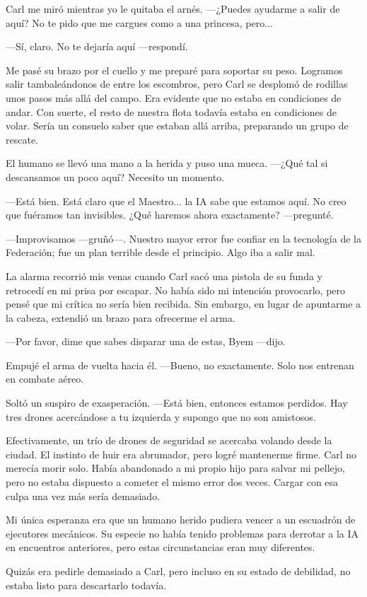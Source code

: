Carl me miró mientras yo le quitaba el arnés. —¿Puedes ayudarme a salir de aquí? No te pido que me cargues como a una princesa, pero...

—Sí, claro. No te dejaría aquí —respondí.

Me pasé su brazo por el cuello y me preparé para soportar su peso. Logramos salir tambaleándonos de entre los escombros, pero Carl se desplomó de rodillas unos pasos más allá del campo. Era evidente que no estaba en condiciones de andar. Con suerte, el resto de nuestra flota todavía estaba en condiciones de volar. Sería un consuelo saber que estaban allá arriba, preparando un grupo de rescate.

El humano se llevó una mano a la herida y puso una mueca. —¿Qué tal si descansamos un poco aquí? Necesito un momento.

—Está bien. Está claro que el Maestro... la IA sabe que estamos aquí. No creo que fuéramos tan invisibles. ¿Qué haremos ahora exactamente? —pregunté.

—Improvisamos —gruñó—. Nuestro mayor error fue confiar en la tecnología de la Federación; fue un plan terrible desde el principio. Algo iba a salir mal.

La alarma recorrió mis venas cuando Carl sacó una pistola de su funda y retrocedí en mi prisa por escapar. No había sido mi intención provocarlo, pero pensé que mi crítica no sería bien recibida. Sin embargo, en lugar de apuntarme a la cabeza, extendió un brazo para ofrecerme el arma.

—Por favor, dime que sabes disparar una de estas, Byem —dijo.

Empujé el arma de vuelta hacia él. —Bueno, no exactamente. Solo nos entrenan en combate aéreo.

Soltó un suspiro de exasperación. —Está bien, entonces estamos perdidos. Hay tres drones acercándose a tu izquierda y supongo que no son amistosos.

Efectivamente, un trío de drones de seguridad se acercaba volando desde la ciudad. El instinto de huir era abrumador, pero logré mantenerme firme. Carl no merecía morir solo. Había abandonado a mi propio hijo para salvar mi pellejo, pero no estaba dispuesto a cometer el mismo error dos veces. Cargar con esa culpa una vez más sería demasiado.

Mi única esperanza era que un humano herido pudiera vencer a un escuadrón de ejecutores mecánicos. Su especie no había tenido problemas para derrotar a la IA en encuentros anteriores, pero estas circunstancias eran muy diferentes.

Quizás era pedirle demasiado a Carl, pero incluso en su estado de debilidad, no estaba listo para descartarlo todavía.
